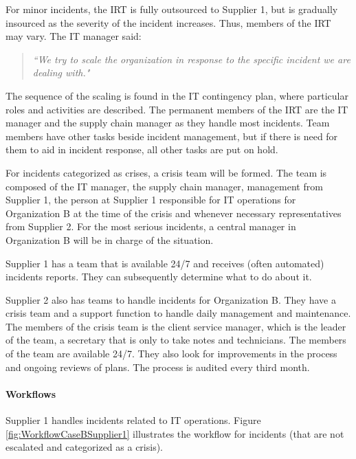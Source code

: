 For minor incidents, the \ac{IRT} is fully outsourced to Supplier 1, but is gradually insourced as the severity of the incident increases. Thus, members of the \ac{IRT} may vary. The IT manager said:

\begin{quote}
\textit{``We try to scale the organization in response to the specific incident we are dealing with."}
\end{quote}

The sequence of the scaling is found in the IT contingency plan, where particular roles and activities are described. The permanent members of the \ac{IRT} are the IT manager and the supply chain manager as they handle most incidents. Team members have other tasks beside incident management, but if there is need for them to aid in incident response, all other tasks are put on hold.

For incidents categorized as crises, a crisis team will be formed. The team is composed of the IT manager, the supply chain manager, management from Supplier 1, the person at Supplier 1 responsible for IT operations for Organization B at the time of the crisis and whenever necessary representatives from Supplier 2. For the most serious incidents, a central manager in Organization B will be in charge of the situation.

Supplier 1 has a team that is available 24/7 and receives (often automated) incidents reports. They can subsequently determine what to do about it.

Supplier 2 also has teams to handle incidents for Organization B. They have a crisis team and a support function to handle daily management and maintenance. The members of the crisis team is the client service manager, which is the leader of the team, a secretary that is only to take notes and technicians. The members of the team are available 24/7. They also look for improvements in the process and ongoing reviews of plans. The process is audited every third month.

\paragraph{Workflows}

Supplier 1 handles incidents related to IT operations. Figure \ref{fig:WorkflowCaseBSupplier1} illustrates the workflow for incidents (that are not escalated and categorized as a crisis).

